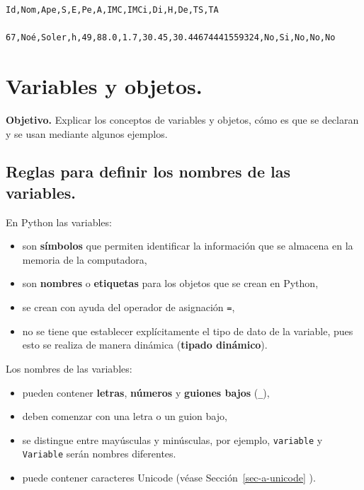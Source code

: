 \documentclass[
  spanish,
  letterpaper,
]{scrbook}
\providecommand{\tightlist}{%
  \setlength{\itemsep}{0pt}\setlength{\parskip}{0pt}}
\theoremstyle{definition}
\theoremstyle{remark}
\begin{document}
\begin{verbatim}
Id,Nom,Ape,S,E,Pe,A,IMC,IMCi,Di,H,De,TS,TA

67,Noé,Soler,h,49,88.0,1.7,30.45,30.44674441559324,No,Si,No,No,No
\end{verbatim}

\cleardoublepage
{}
{}
\appendix

\chapter{Variables y objetos.}\label{sec-a-var-y-obj}

\textbf{Objetivo.} Explicar los conceptos de variables y objetos, cómo
es que se declaran y se usan mediante algunos ejemplos.

\section{Reglas para definir los nombres de las
variables.}\label{sec-a-reglas_nombres}

En Python las variables:

\begin{itemize}
\tightlist
\item
  son \textbf{símbolos} que permiten identificar la información que se
  almacena en la memoria de la computadora,
\item
  son \textbf{nombres} o \textbf{etiquetas} para los objetos que se
  crean en Python,
\item
  se crean con ayuda del operador de asignación \texttt{=},
\item
  no se tiene que establecer explícitamente el tipo de dato de la
  variable, pues esto se realiza de manera dinámica (\textbf{tipado
  dinámico}).
\end{itemize}

Los nombres de las variables:

\begin{itemize}
\tightlist
\item
  pueden contener \textbf{letras}, \textbf{números} y \textbf{guiones
  bajos} (\texttt{\_}),
\item
  deben comenzar con una letra o un guion bajo,
\item
  se distingue entre mayúsculas y minúsculas, por ejemplo,
  \texttt{variable} y \texttt{Variable} serán nombres diferentes.
\item
  puede contener caracteres Unicode (véase Sección~\ref{sec-a-unicode}
  ).
\end{itemize}
\end{document}
